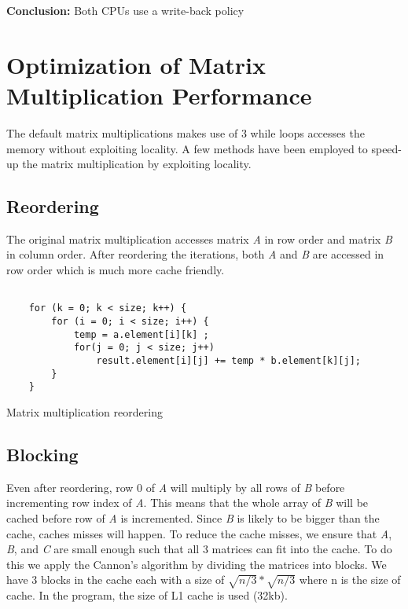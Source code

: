 \documentclass{article}
\begin{document}
\begin{list}{•}{•}
\item \textbf{Conclusion:} Both CPUs use a write-back policy
\end{list}

\newpage 

\section{Optimization of Matrix Multiplication Performance}
The default matrix multiplications makes use of 3 while loops accesses the memory without exploiting locality. A few methods have been employed to speed-up the matrix multiplication by exploiting locality.



\subsection{Reordering}


The original matrix multiplication accesses matrix \textit{A} in row order and matrix \textit{B} in column order. After reordering the iterations, both \textit{A} and \textit{B} are accessed in row order which is much more cache friendly.

\begin{program}[H]
\begin{verbatim}

    for (k = 0; k < size; k++) {
        for (i = 0; i < size; i++) {
            temp = a.element[i][k] ;
            for(j = 0; j < size; j++)
                result.element[i][j] += temp * b.element[k][j];
        }
    }
\end{verbatim}
  \caption{Matrix multiplication reordering}
\end{program}

\subsection{Blocking}

Even after reordering, row 0 of \textit{A} will multiply by all rows of \textit{B} before incrementing row index of \textit{A}. This means that the whole array of \textit{B} will be cached before row of \textit{A} is incremented.  Since \textit{B} is likely to be bigger than the cache, caches misses will happen. To reduce the cache misses, we ensure that \textit{A}, \textit{B}, and \textit{C} are small enough such that all 3 matrices can fit into the cache. To do this we apply the Cannon's algorithm by dividing the matrices into blocks. We have 3 blocks in the cache each with a size of 
\begin{math}\sqrt{n/3} * \sqrt{n/3}\end{math} where n is the size of cache. In the program, the size of L1 cache is used (32kb).
\end{document}
